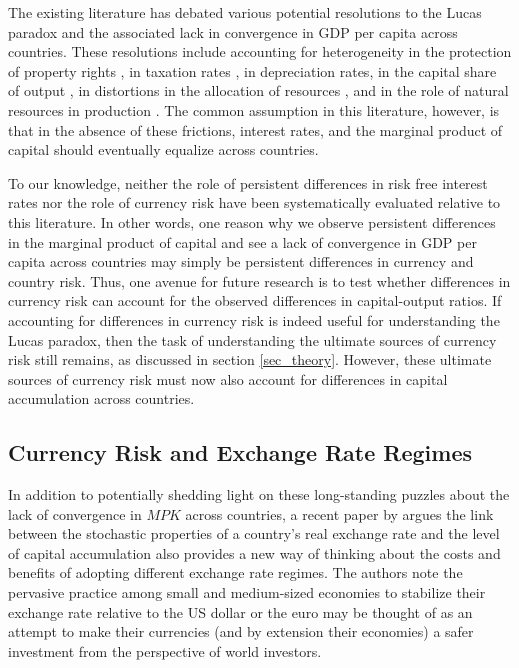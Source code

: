 \documentclass{ar-1col}
\begin{document}
The existing literature has debated various potential resolutions to the Lucas paradox and the associated lack in convergence in GDP per capita across countries. These resolutions include accounting for heterogeneity in the protection of property rights \citep{HallJones1997}, in taxation rates \citep{Jorgenson1996}, in depreciation rates, in the capital share of output \citep{Neiman2014}, in distortions in the allocation of resources \citep{HsiehKlenow2009}, and in the role of natural resources in production \citep{CaselliFeyrer2007, Monge-Naranjoetal2019}.  The common assumption in this literature, however, is that in the absence of these frictions, interest rates, and the marginal product of capital should eventually equalize across countries.

To our knowledge, neither the role of persistent differences in risk free interest rates nor the role of currency risk have been systematically evaluated relative to this literature. In other words, one reason why we observe persistent differences in the marginal product of capital and see a lack of convergence in GDP per capita across countries may simply be persistent differences in currency and country risk. Thus, one avenue for future research is to test whether differences in currency risk can account for the observed differences in capital-output ratios. If accounting for differences in currency risk is indeed useful for understanding the Lucas paradox, then the task of understanding the ultimate sources of currency risk still remains, as discussed in section \ref{sec_theory}. However, these ultimate sources of currency risk must now also account for differences in capital accumulation across countries. 

\subsection{Currency Risk and Exchange Rate Regimes\label{sec_regimes}}

In addition to potentially shedding light on these long-standing puzzles about the lack of convergence in $MPK$ across countries, a recent paper by \citet{HassanMertensZhang2020} argues the link between the stochastic properties of a country's real exchange rate and the level of capital accumulation also provides a new way of thinking about the costs and benefits of adopting different exchange rate regimes. The authors note the pervasive practice among small and medium-sized economies to stabilize their exchange rate relative to the US dollar or the euro \citep{ilzetzki2018exchange} may be thought of as an attempt to make their currencies (and by extension their economies) a safer investment from the perspective of world investors. 
\end{document}
